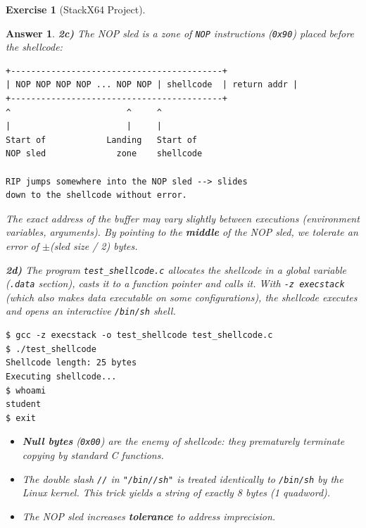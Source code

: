 \documentclass[a4paper,11pt]{article}
\theoremstyle{plain}
\newtheorem{correction}{Answer}
\theoremstyle{definition}
\newtheorem{exercice}{Exercise}
\begin{document}
\begin{exercice}[StackX64 Project]
\begin{correction}
\textbf{2c)} The NOP sled is a zone of \texttt{NOP} instructions (\texttt{0x90}) placed before the shellcode:
\begin{lstlisting}[style=GDBStyle]
+------------------------------------------+
| NOP NOP NOP NOP ... NOP NOP | shellcode  | return addr |
+------------------------------------------+
^                       ^     ^
|                       |     |
Start of            Landing   Start of
NOP sled              zone    shellcode

RIP jumps somewhere into the NOP sled --> slides
down to the shellcode without error.
\end{lstlisting}

The exact address of the buffer may vary slightly between executions (environment variables, arguments). By pointing to the \textbf{middle} of the NOP sled, we tolerate an error of $\pm$(sled size / 2) bytes.

\textbf{2d)} The program \texttt{test\_shellcode.c} allocates the shellcode in a global variable (\texttt{.data} section), casts it to a function pointer and calls it. With \texttt{-z execstack} (which also makes data executable on some configurations), the shellcode executes and opens an interactive \texttt{/bin/sh} shell.

\begin{lstlisting}[style=GDBStyle]
$ gcc -z execstack -o test_shellcode test_shellcode.c
$ ./test_shellcode
Shellcode length: 25 bytes
Executing shellcode...
$ whoami
student
$ exit
\end{lstlisting}

\begin{pointcle}
\begin{itemize}
    \item \textbf{Null bytes} (\texttt{0x00}) are the enemy of shellcode: they prematurely terminate copying by standard C functions.
    \item The double slash \texttt{//} in \texttt{"/bin//sh"} is treated identically to \texttt{/bin/sh} by the Linux kernel. This trick yields a string of exactly 8 bytes (1 quadword).
    \item The NOP sled increases \textbf{tolerance} to address imprecision.
\end{itemize}
\end{pointcle}

\end{correction}




\end{exercice}
\end{document}
